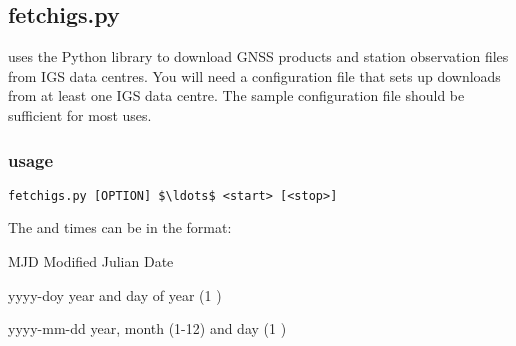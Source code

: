 \subsection{fetchigs.py}

\hypertarget{h:fetchigs}{}

 uses the Python library  to download GNSS products and station observation
files from IGS data centres. You will need a configuration file that sets up downloads from at least one IGS data
centre. The sample configuration file should be sufficient for most uses.

\subsubsection{usage}

\begin{lstlisting}[mathescape=true]
fetchigs.py [OPTION] $\ldots$ <start> [<stop>]
\end{lstlisting}

The  and  times can be in the format:
\begin{description*}
\item[MJD] Modified Julian Date
\item[yyyy-doy] year and day of year (1 \textellipsis)
\item[yyyy-mm-dd] year, month (1-12) and day (1 \textellipsis)
\end{description*}

